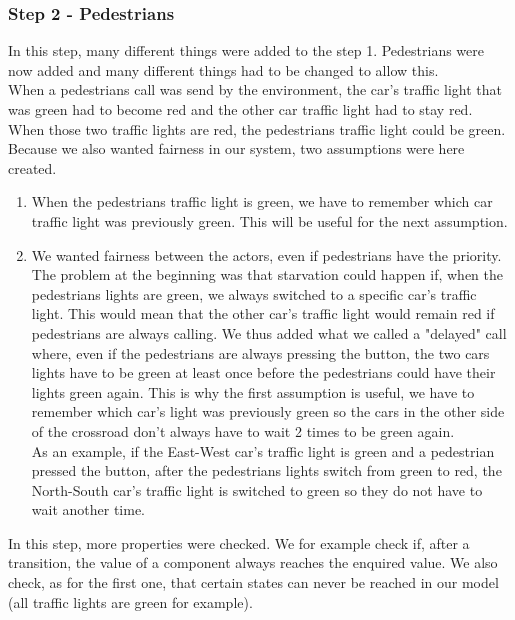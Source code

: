 \subsubsection{Step 2 - Pedestrians}
In this step, many different things were added to the step 1. Pedestrians were now added and many different things had to be changed to allow this. \\ 
When a pedestrians call was send by the environment, the car's traffic light that was green had to become red and the other car traffic light had to stay red. When those two traffic lights are red, the pedestrians traffic light could be green. Because we also wanted fairness in our system, two assumptions were here created.
\begin{enumerate}
    \item When the pedestrians traffic light is green, we have to remember which car traffic light was previously green. This will be useful for the next assumption.
    \item We wanted fairness between the actors, even if pedestrians have the priority. The problem at the beginning was that starvation could happen if, when the pedestrians lights are green, we always switched to a specific car's traffic light. This would mean that the other car's traffic light would remain red if pedestrians are always calling. We thus added what we called a "delayed" call where, even if the pedestrians are always pressing the button, the two cars lights have to be green at least once before the pedestrians could have their lights green again. This is why the first assumption is useful, we have to remember which car's light was previously green so the cars in the other side of the crossroad don't always have to wait 2 times to be green again. \\
    As an example, if the East-West car's traffic light is green and a pedestrian pressed the button, after the pedestrians lights switch from green to red, the North-South car's traffic light is switched to green so they do not have to wait another time.
\end{enumerate}
In this step, more properties were checked. We for example check if, after a transition, the value of a component always reaches the enquired value. We also check, as for the first one, that certain states can never be reached in our model (all traffic lights are green for example).

